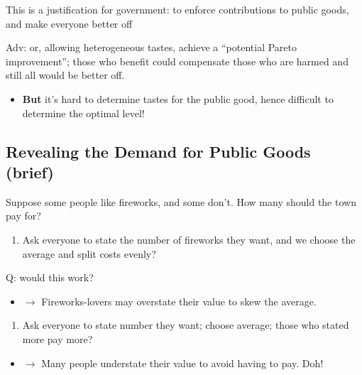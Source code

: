 \documentclass[]{article}
\providecommand{\tightlist}{%
  \setlength{\itemsep}{0pt}\setlength{\parskip}{0pt}}
\begin{document}
This is a justification for government: to enforce contributions to
public goods, and make everyone better off

\textcolor{RawSienna}{Adv: or, allowing heterogeneous tastes, achieve a “potential Pareto improvement”; those who benefit could compensate those who are harmed and still all would be better off.}

\begin{itemize}
\tightlist
\item
  \textbf{But} it's hard to determine tastes for the public good, hence
  difficult to determine the optimal level!
\end{itemize}

\hypertarget{revealing-the-demand-for-public-goods-brief}{%
\subsection{Revealing the Demand for Public Goods
(brief)}\label{revealing-the-demand-for-public-goods-brief}}

Suppose some people like fireworks, and some don't. How many should the
town pay for?

\begin{enumerate}
\def\labelenumi{\roman{enumi}.}
\tightlist
\item
  Ask everyone to state the number of fireworks they want, and we choose
  the average and split costs evenly?
\end{enumerate}

Q: would this work?\\

\begin{itemize}
\tightlist
\item
  \(\rightarrow\) Fireworks-lovers may overstate their value to skew the
  average.
\end{itemize}

\begin{enumerate}
\def\labelenumi{\roman{enumi}.}
\setcounter{enumi}{1}
\tightlist
\item
  Ask everyone to state number they want; choose average; those who
  stated more pay more?
\end{enumerate}

\begin{itemize}
\tightlist
\item
  \(\rightarrow\) Many people understate their value to avoid having to
  pay. Doh!
\end{itemize}
\end{document}
